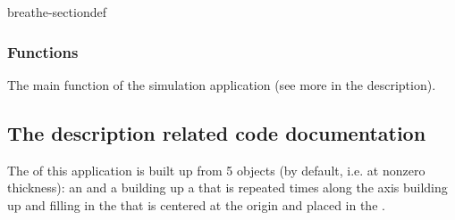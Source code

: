 \documentclass[letterpaper,10pt,english]{sphinxmanual}
\begin{document}
\begin{sphinxuseclass}{breathe-sectiondef}\subsubsection*{Functions}

\begin{fulllineitems}
\label{\detokenize{Simulation/SimulationCodeDoc:_CPPv44mainiA_Pc}}
\pysigstartsignatures
\pysigstartmultiline
{}
\pysigstopmultiline
\pysigstopsignatures
\sphinxAtStartPar
The main function of the  simulation application (see more in the description). 

\end{fulllineitems}


\end{sphinxuseclass}

\subsection{The  description related code documentation}
\label{\detokenize{Simulation/SimulationCodeDoc:the-geometry-description-related-code-documentation}}
\sphinxAtStartPar
The {\hyperref[\detokenize{Simulation/SimulationCodeDoc:_CPPv48Geometry}]{}} of this application is built up from 5 {\hyperref[\detokenize{Simulation/SimulationCodeDoc:_CPPv43Box}]{}}
objects (by default, i.e. at non\sphinxhyphen{}zero  thickness): an  and
a  building up a  that is repeated  times along the \sphinxhyphen{}axis
building up and filling in the  that is centered at the origin
and placed in the .
\end{document}

